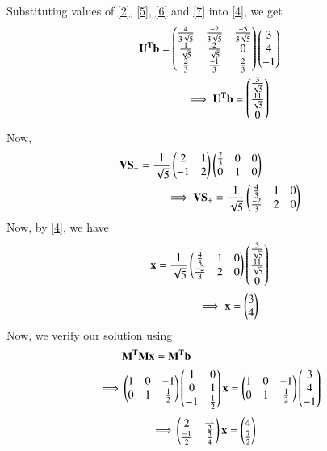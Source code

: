 \documentclass[journal,12pt,twocolumn]{IEEEtran}
\begin{document}
Substituting values of \eqref{2}, \eqref{5}, \eqref{6} and \eqref{7} into \eqref{4}, we get
\begin{align}
& \mathbf{U^Tb} =  \begin{pmatrix}\frac{4}{3\sqrt{5}} & \frac{-2}{3\sqrt{5}} & \frac{-5}{3\sqrt{5}} \\ \frac{1}{\sqrt{5}}   & \frac{2}{\sqrt{5}} & 0 \\ \frac{2}{3} & \frac{-1}{3} & \frac{2}{3}\end{pmatrix}
\begin{pmatrix}3 \\4\\-1\end{pmatrix} \\
& \qquad \qquad\implies \mathbf{U^Tb} = \begin{pmatrix}\frac{3}{\sqrt{5}} \\ \frac{11}{\sqrt{5}} \\ 0\end{pmatrix} 
\end{align}
Now,
\begin{align}
& \mathbf{VS_+} = \frac{1}{\sqrt{5}}\begin{pmatrix}2 & 1 \\ -1 & 2 \end{pmatrix}\begin{pmatrix}\frac{2}{3} & 0 & 0 \\ 0 & 1 & 0\end{pmatrix}\\
& \qquad \qquad \implies \mathbf{VS_+} = \frac{1}{\sqrt{5}}\begin{pmatrix}\frac{4}{3} & 1 &0 \\ \frac{-2}{3} & 2 & 0 \end{pmatrix}
\end{align}
Now, by \eqref{4}, we have
\begin{align}
& \mathbf{x} = \frac{1}{\sqrt{5}}\begin{pmatrix}\frac{4}{3} & 1 &0 \\ \frac{-2}{3} & 2 & 0 \end{pmatrix} 
\begin{pmatrix}\frac{3}{\sqrt{5}} \\ \frac{11}{\sqrt{5}} \\ 0\end{pmatrix}  \\
& \qquad \qquad \implies \mathbf{x} = \begin{pmatrix}3 \\ 4\end{pmatrix}
\end{align}
Now, we verify our solution using
\begin{align}
&	\mathbf{M^TMx = M^Tb} \\
\implies & \begin{pmatrix}1 & 0 & -1  \\ 0 & 1 & \frac{1}{2} \end{pmatrix}\begin{pmatrix}1 & 0 \\ 0 & 1 \\ -1 & \frac{1}{2} \end{pmatrix}\mathbf{x} = \begin{pmatrix}1 & 0 & -1  \\ 0 & 1 & \frac{1}{2} \end{pmatrix}\begin{pmatrix}3 \\4\\-1\end{pmatrix} 
\end{align}
\begin{align}
\implies & \begin{pmatrix}2 & \frac{-1}{2} \\ \frac{-1}{2} & \frac{5}{4}\end{pmatrix}\mathbf{x} =\begin{pmatrix}4 \\\frac{7}{2}\end{pmatrix}
\end{align}
\end{document}
